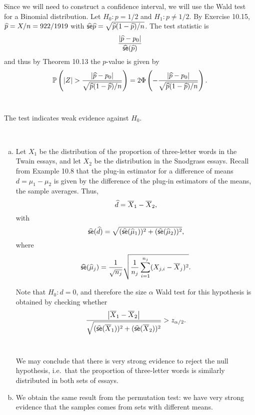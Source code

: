 \begin{ex}
  Since we will need to construct a confidence interval, we will use the Wald
  test for a Binomial distribution. Let $H_0: p=1/2$ and $H_1:p\neq 1/2$. By
  Exercise 10.15, $\widehat{p}=X/n=922/1919$ with
  $\widehat{\textsf{se}}{\widehat{p}}=\sqrt{\widehat{p}(1-\widehat{p})/n}$. The test statistic is
  \[
    \frac{|\widehat{p}-p_0|}{\widehat{\textsf{se}}(\widehat{p})}
  \]
  and thus by Theorem 10.13 the $p$-value is given by
  \[
    \P{|Z|>\frac{|\phat-p_0|}{\sqrt{\phat(1-\phat)/n}}}
    =2\Phi\left(
    -\frac{|\phat-p_0|}{\sqrt{\phat(1-\phat)/n}}
    \right).
  \]
  \inputminted{python}{../code/10-06.py}
  \inputminted{text}{../output/10-06.txt}

  The test indicates weak evidence against $H_0$.
\end{ex}

\begin{ex}~
  \begin{enumerate}[(a)]
    \item Let $X_1$ be the distribution of the proportion of three-letter words
          in the Twain essays, and let $X_2$ be the distribution in the
          Snodgrass essays. Recall from Example 10.8 that the plug-in estimator
          for a difference of means $d=\mu_1-\mu_2$ is given by the difference
          of the plug-in estimators of the means, the sample averages. Thus,
          \[
            \widehat{d}=\overline{X}_1-\overline{X}_2,
          \]
          with
          \[
            \widehat{\textsf{se}}(\widehat{d})
            =\sqrt{(\widehat{\textsf{se}}(\widehat{\mu}_1))^2+(\widehat{\textsf{se}}(\widehat{\mu}_2))^2},
          \]
          where
          \[
            \widehat{\textsf{se}}(\widehat{\mu}_j)=\frac{1}{\sqrt{n_j}}
            \sqrt{\frac{1}{n_j}\sum_{i=1}^{n_j}(X_{j,i}-\overline{X}_j)^2}.
          \]

          Note that $H_0: d=0$, and therefore the size $\alpha$ Wald test for
          this hypothesis is obtained by checking whether
          \[
            \frac{\left|\overline{X}_1-\overline{X}_2\right|}{
              \sqrt{(\widehat{\textsf{se}}(\overline{X}_1))^2+(\widehat{\textsf{se}}(\overline{X}_2))^2}}
            > z_{\alpha/2}.
          \]

          \inputminted{python}{../code/10-07.py}
          \inputminted{text}{../output/10-07.txt}

          We may conclude that there is very strong evidence to reject the null
          hypothesis, i.e.\ that the proportion of three-letter words is
          similarly distributed in both sets of essays.
    \item We obtain the same result from the permutation test: we have very
          strong evidence that the samples comes from sets with different means.
  \end{enumerate}
\end{ex}

